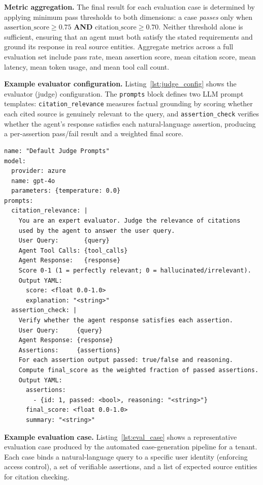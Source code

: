 \documentclass[10pt,twocolumn]{article}
\begin{document}
\textbf{Metric aggregation.}
The final result for each evaluation case is determined by applying minimum
pass thresholds to both dimensions: a case \emph{passes} only when
$\text{assertion\_score} \geq 0.75$ \textbf{AND}
$\text{citation\_score} \geq 0.70$.
Neither threshold alone is sufficient, ensuring that an agent must both satisfy
the stated requirements and ground its response in real source entities.
Aggregate metrics across a full evaluation set include pass rate, mean
assertion score, mean citation score, mean latency, mean token usage, and mean
tool call count.

\textbf{Example evaluator configuration.}
Listing~\ref{lst:judge_config} shows the evaluator (judge) configuration.
The \texttt{prompts} block defines two LLM prompt templates:
\texttt{citation\_relevance} measures factual grounding by scoring whether
each cited source is genuinely relevant to the query, and
\texttt{assertion\_check} verifies whether the agent's response satisfies
each natural-language assertion, producing a per-assertion pass/fail result
and a weighted final score.

\begin{lstlisting}[caption={Condensed evaluator (judge) configuration (\texttt{default\_judge.yaml}).},label={lst:judge_config}]
name: "Default Judge Prompts"
model:
  provider: azure
  name: gpt-4o
  parameters: {temperature: 0.0}
prompts:
  citation_relevance: |
    You are an expert evaluator. Judge the relevance of citations
    used by the agent to answer the user query.
    User Query:       {query}
    Agent Tool Calls: {tool_calls}
    Agent Response:   {response}
    Score 0-1 (1 = perfectly relevant; 0 = hallucinated/irrelevant).
    Output YAML:
      score: <float 0.0-1.0>
      explanation: "<string>"
  assertion_check: |
    Verify whether the agent response satisfies each assertion.
    User Query:     {query}
    Agent Response: {response}
    Assertions:     {assertions}
    For each assertion output passed: true/false and reasoning.
    Compute final_score as the weighted fraction of passed assertions.
    Output YAML:
      assertions:
        - {id: 1, passed: <bool>, reasoning: "<string>"}
      final_score: <float 0.0-1.0>
      summary: "<string>"
\end{lstlisting}

\textbf{Example evaluation case.}
Listing~\ref{lst:eval_case} shows a representative evaluation case
produced by the automated case-generation pipeline for a tenant.
Each case binds a natural-language query to a specific user identity
(enforcing access control), a set of verifiable assertions, and a list
of expected source entities for citation checking.
\end{document}
